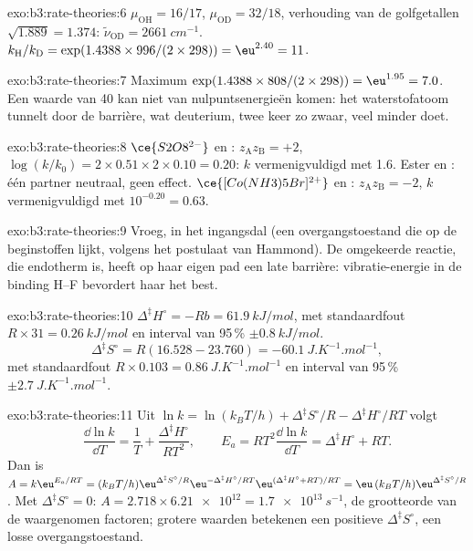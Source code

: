 \begin{solution}{exo:b3:rate-theories:6}
$\mu_{\mathrm{OH}} = 16/17$, $\mu_{\mathrm{OD}} = 32/18$, verhouding van de golfgetallen $\sqrt{1.889} = 1.374$:
$\tilde\nu_{\mathrm{OD}} = \qty{2661}{cm^{-1}}$. $k_{\mathrm H}/k_{\mathrm D} = \exp(1.4388 \times 996/(2 \times 298)) = \eu^{2.40} = 11$.
\end{solution}

\begin{solution}{exo:b3:rate-theories:7}
Maximum $\exp(1.4388 \times 808/(2 \times 298)) = \eu^{1.95} = 7.0$. Een
waarde van 40 kan niet van nulpuntsenergieën komen: het waterstofatoom
tunnelt door de barrière, wat deuterium, twee keer zo zwaar, veel minder
doet.
\end{solution}

\begin{solution}{exo:b3:rate-theories:8}
$\ce{S2O8^{2-}}$ en : $z_{\mathrm A}z_{\mathrm B} = +2$, $\log(k/k_0) = 2 \times 0.51 \times 2 \times 0.10 = 0.20$: $k$
vermenigvuldigd met 1.6. Ester en : één partner neutraal, geen
effect. $\ce{[Co(NH3)5Br]^{2+}}$ en : $z_{\mathrm A}z_{\mathrm B} = -2$,
$k$ vermenigvuldigd met $10^{-0.20} = 0.63$.
\end{solution}

\begin{solution}{exo:b3:rate-theories:9}
Vroeg, in het ingangsdal (een overgangstoestand die op de beginstoffen
lijkt, volgens het postulaat van Hammond). De omgekeerde reactie, die
endotherm is, heeft op haar eigen pad een late barrière: vibratie-energie
in de binding H--F bevordert haar het best.
\end{solution}

\begin{solution}{exo:b3:rate-theories:10}
$\Delta^{\ddagger}H^\circ = -Rb = \qty{61.9}{kJ/mol}$, met standaardfout $R \times 31 = \qty{0.26}{kJ/mol}$ en
interval van 95\,\% $\pm\qty{0.8}{kJ/mol}$.
\[
  \Delta^{\ddagger}S^\circ = R(16.528 - 23.760) = \qty{-60.1}{J.K^{-1}.mol^{-1}},
\]
met standaardfout $R \times 0.103 = \qty{0.86}{J.K^{-1}.mol^{-1}}$ en interval van 95\,\% $\pm\qty{2.7}{J.K^{-1}.mol^{-1}}$.
\end{solution}

\begin{solution}{exo:b3:rate-theories:11}
Uit $\ln k = \ln(k_BT/h) + \Delta^{\ddagger}S^\circ/R - \Delta^{\ddagger}H^\circ/RT$ volgt
\[
  \frac{\dd\ln k}{\dd T} = \frac1T + \frac{\Delta^{\ddagger}H^\circ}{RT^2}, \qquad
  E_a = RT^2\frac{\dd\ln k}{\dd T} = \Delta^{\ddagger}H^\circ + RT .
\] Dan is $A = k\eu^{E_a/RT} = (k_BT/h)\eu^{\Delta^{\ddagger}S^\circ/R}\eu^{-\Delta^{\ddagger}H^\circ/RT}\eu^{(\Delta^{\ddagger}H^\circ + RT)/RT} =
\eu\,(k_BT/h)\eu^{\Delta^{\ddagger}S^\circ/R}$. Met $\Delta^{\ddagger}S^\circ = 0$: $A = 2.718 \times \num{6.21e12} = \qty{1.7e13}{s^{-1}}$, de
grootteorde van de waargenomen factoren; grotere waarden betekenen een
positieve $\Delta^{\ddagger}S^\circ$, een losse overgangstoestand.
\end{solution}

